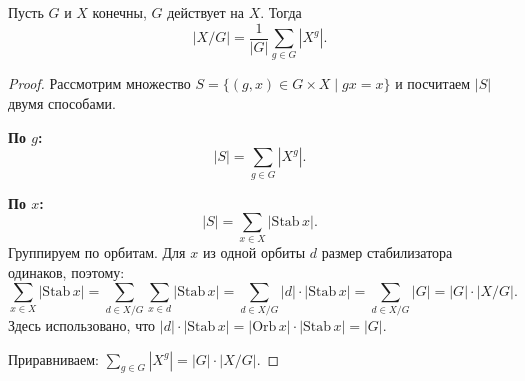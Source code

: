 \begin{theorem}
    Пусть $G$ и $X$ конечны, $G$ действует на $X$. Тогда
    \[
        |X / G| = \frac{1}{|G|} \sum_{g \in G} |X^g|.
    \]

    \begin{proof}
        Рассмотрим множество $S = \{(g, x) \in G \times X \mid gx = x\}$ и посчитаем $|S|$ двумя способами.

        \textbf{По $g$:}
        \[
            |S| = \sum_{g \in G} |X^g|.
        \]

        \textbf{По $x$:}
        \[
            |S| = \sum_{x \in X} |\mathrm{Stab}\, x|.
        \]
        Группируем по орбитам. Для $x$ из одной орбиты $d$ размер стабилизатора одинаков, поэтому:
        \[
            \sum_{x \in X} |\mathrm{Stab}\, x| = \sum_{d \in X/G} \sum_{x \in d} |\mathrm{Stab}\, x| = \sum_{d \in X/G}
            |d| \cdot |\mathrm{Stab}\, x| = \sum_{d \in X/G} |G| = |G| \cdot |X/G|.
        \]
        Здесь использовано, что $|d| \cdot |\mathrm{Stab}\, x| = |\mathrm{Orb}\, x| \cdot |\mathrm{Stab}\, x| = |G|$.

        Приравниваем: $\sum_{g \in G} |X^g| = |G| \cdot |X/G|$.
    \end{proof}
\end{theorem}



